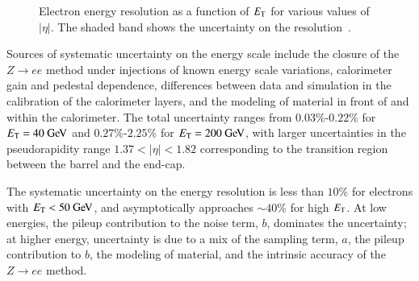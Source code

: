 \begin{figure}[htbp]
{	}
	\hfill
	\caption{Electron energy resolution as a function of $E_{\text{T}}$ for various values of $|\eta|$. The shaded band shows the uncertainty on the resolution~\cite{TheATLASCollaboration:2014gf}.}
	\label{fig:reco-el-EER}
\end{figure}


Sources of systematic uncertainty on the energy scale include the closure of the $Z\rightarrow ee$ method under injections of known energy scale variations, calorimeter gain and pedestal dependence, differences between data and simulation in the calibration of the calorimeter layers, and the modeling of material in front of and within the calorimeter. The total uncertainty ranges from $0.03\%$-$0.22$\% for $\Et=40 \GeV$ and $0.27\%$-$2.25$\% for $\Et = 200 \GeV$, with larger uncertainties in the pseudorapidity range $1.37<|\eta|<1.82$ corresponding to the transition region between the barrel and the end-cap. 

The systematic uncertainty on the energy resolution is less than $10\%$ for electrons with $\Et<50 \GeV$, and asymptotically approaches $\sim 40\%$ for high $E_{\mathrm{T}}$. At low energies, the pileup contribution to the noise term, $b$, dominates the uncertainty; at higher energy, uncertainty is due to a mix of the sampling term, $a$, the pileup contribution to $b$, the modeling of material, and the intrinsic accuracy of the $Z\rightarrow ee$ method.


